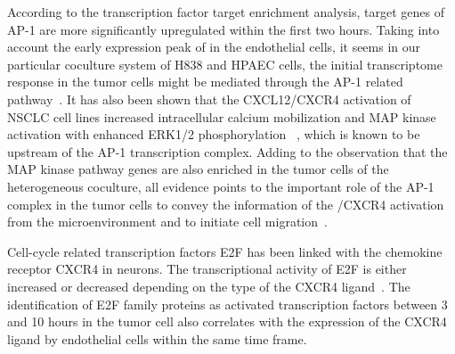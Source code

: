 \begin{itemize}
According to the transcription factor target enrichment analysis, target genes
of AP-1 are more significantly upregulated within the first two hours. 
Taking into account
the early expression peak of \tnfa in the endothelial cells, it seems
in our particular coculture system of H838 and HPAEC cells, the initial 
transcriptome response in the tumor cells might be mediated through the AP-1
related pathway~\citep{Kulbe2005}. It has also been
shown that the CXCL12/CXCR4 activation of NSCLC cell lines 
increased intracellular calcium mobilization and MAP kinase 
activation with enhanced ERK1/2 phosphorylation~%
\citep{Belperio2004}, which is 
known to be upstream of the AP-1 transcription complex.
Adding to the observation that the MAP kinase pathway genes are also enriched 
in the tumor cells of the heterogeneous coculture, 
all evidence points to the important role of the
AP-1 complex in the tumor cells to convey the information of  
the \sdfonea/CXCR4 activation from the microenvironment and to initiate cell
migration~\citep{Busch2008,Singh2012}.

Cell-cycle related transcription factors E2F has been linked with the chemokine
receptor CXCR4 in neurons. The transcriptional activity of E2F is either 
increased or decreased depending on the type of the CXCR4 ligand~\citep{Khan2003}.
The identification of E2F family proteins as activated transcription factors 
between 3 and 10 hours in the tumor cell also correlates with the expression of 
the CXCR4 ligand \sdfonea by endothelial cells within the same time frame.



\end{itemize}
